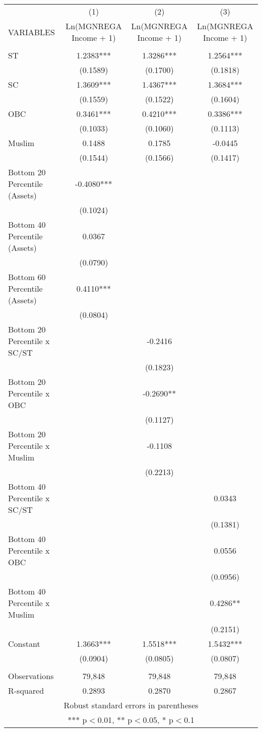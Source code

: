 \documentclass[]{article}
\begin{document}
\begin{tabular}{lccc} \hline
 & (1) & (2) & (3) \\
VARIABLES & Ln(MGNREGA Income + 1) & Ln(MGNREGA Income + 1) & Ln(MGNREGA Income + 1) \\ \hline
 &  &  &  \\
ST & 1.2383*** & 1.3286*** & 1.2564*** \\
 & (0.1589) & (0.1700) & (0.1818) \\
SC & 1.3609*** & 1.4367*** & 1.3684*** \\
 & (0.1559) & (0.1522) & (0.1604) \\
OBC & 0.3461*** & 0.4210*** & 0.3386*** \\
 & (0.1033) & (0.1060) & (0.1113) \\
Muslim & 0.1488 & 0.1785 & -0.0445 \\
 & (0.1544) & (0.1566) & (0.1417) \\
Bottom 20 Percentile (Assets) & -0.4080*** &  &  \\
 & (0.1024) &  &  \\
Bottom 40 Percentile (Assets) & 0.0367 &  &  \\
 & (0.0790) &  &  \\
Bottom 60 Percentile (Assets) & 0.4110*** &  &  \\
 & (0.0804) &  &  \\
Bottom 20 Percentile x SC/ST &  & -0.2416 &  \\
 &  & (0.1823) &  \\
Bottom 20 Percentile x OBC &  & -0.2690** &  \\
 &  & (0.1127) &  \\
Bottom 20 Percentile x Muslim &  & -0.1108 &  \\
 &  & (0.2213) &  \\
Bottom 40 Percentile x SC/ST &  &  & 0.0343 \\
 &  &  & (0.1381) \\
Bottom 40 Percentile x OBC &  &  & 0.0556 \\
 &  &  & (0.0956) \\
Bottom 40 Percentile x Muslim &  &  & 0.4286** \\
 &  &  & (0.2151) \\
Constant & 1.3663*** & 1.5518*** & 1.5432*** \\
 & (0.0904) & (0.0805) & (0.0807) \\
 &  &  &  \\
Observations & 79,848 & 79,848 & 79,848 \\
 R-squared & 0.2893 & 0.2870 & 0.2867 \\ \hline
\multicolumn{4}{c}{ Robust standard errors in parentheses} \\
\multicolumn{4}{c}{ *** p$<$0.01, ** p$<$0.05, * p$<$0.1} \\
\end{tabular}
\end{document}
